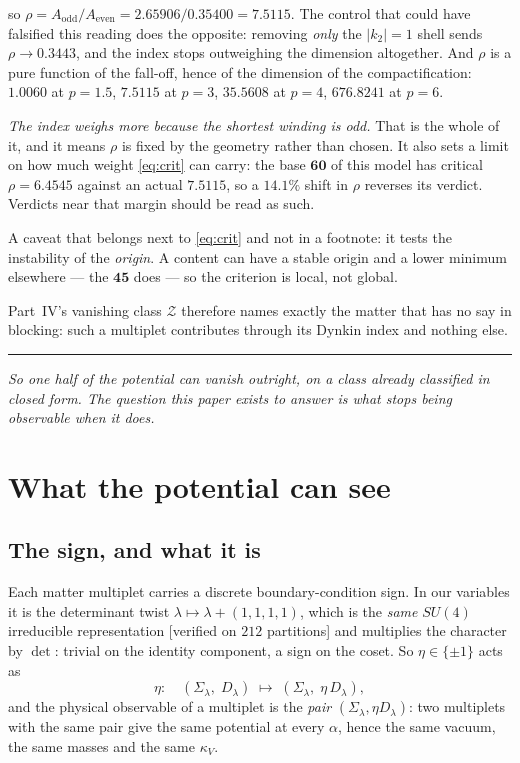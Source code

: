 \documentclass[11pt,a4paper]{article}
\newcommand{\su}[1]{SU(#1)}
\newcommand{\Sig}{\Sigma_\lambda}
\newcommand{\Dl}{D_\lambda}
\newcommand{\bridge}[1]{\par\medskip\noindent
  \textcolor{hdrblue!45}{\rule{2.2cm}{0.6pt}}\;\;\parbox[t]{0.84\textwidth}{\small\itshape
  \textcolor{hdrblue!85}{#1}}\par\medskip}
\begin{document}
\noindent so $\rho=A_{\mathrm{odd}}/A_{\mathrm{even}}=2.65906/0.35400=7.5115$. The control that could have
falsified this reading does the opposite: removing \emph{only} the $|k_2|=1$ shell sends
$\rho\to0.3443$, and the index stops outweighing the dimension altogether. And $\rho$ is a pure
function of the fall-off, hence of the dimension of the compactification: $1.0060$ at $p=1.5$,
$7.5115$ at $p=3$, $35.5608$ at $p=4$, $676.8241$ at $p=6$.

\emph{The index weighs more because the shortest winding is odd.} That is the whole of it, and it
means $\rho$ is fixed by the geometry rather than chosen. It also sets a limit on how much weight
\eqref{eq:crit} can carry: the base $\mathbf{60}$ of this model has critical $\rho=6.4545$ against an
actual $7.5115$, so a $14.1\%$ shift in $\rho$ reverses its verdict. Verdicts near that margin should be
read as such.

\medskip
A caveat that belongs next to \eqref{eq:crit} and not in a footnote:
it tests the instability of the \emph{origin}. A content can have a stable origin and a
lower minimum elsewhere --- the $\mathbf{45}$ does --- so the criterion is local, not global.

Part~IV's vanishing class $\mathcal Z$ therefore names exactly the matter that has no say in
blocking: such a multiplet contributes through its Dynkin index and nothing else.

\bridge{So one half of the potential can vanish outright, on a class already classified in closed
form. The question this paper exists to answer is what stops being observable when it does.}

\section{What the potential can see}\label{sec:obs}

\subsection*{The sign, and what it is}

Each matter multiplet carries a discrete boundary-condition sign. In our variables it is the
determinant twist $\lambda\mapsto\lambda+(1,1,1,1)$, which is the \emph{same} $\su4$ irreducible
representation [verified on $212$ partitions] and multiplies the character by $\det$: trivial on the
identity component, a sign on the coset. So $\eta\in\{\pm1\}$ acts as
\begin{equation}\label{eq:etaact}
\eta:\quad (\Sig,\;\Dl)\;\longmapsto\;(\Sig,\;\eta\,\Dl),
\end{equation}
and the physical observable of a multiplet is the \emph{pair} $(\Sig,\eta\Dl)$: two multiplets with
the same pair give the same potential at every $\alpha$, hence the same vacuum, the same masses and
the same $\kappa_V$.
\end{document}

